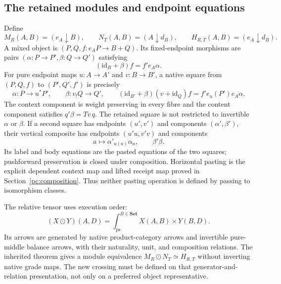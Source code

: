\documentclass[11pt,a4paper]{article}
\theoremstyle{definition}
\newcommand{\Set}{\mathbf{Set}}
\newcommand{\id}{\mathrm{id}}
\newcommand{\psint}{\int_{\mathrm{ps}}}
\begin{document}
\subsection{The retained modules and endpoint equations}

Define
\[
 M_R(A,B)=(e_A\downarrow B),\qquad
 N_T(A,B)=(A\downarrow d_B),\qquad
 H_{R,T}(A,B)=(e_A\downarrow d_B).
\]
A mixed object is $(P,Q,f:e_AP\to B+Q)$. Its fixed-endpoint morphisms are
pairs $(\alpha:P\to P',\beta:Q\to Q')$ satisfying
\[
 (\id_B+\beta)f=f'e_A\alpha.
\]
For pure endpoint maps $u:A\to A'$ and $v:B\to B'$, a native square from
$(P,Q,f)$ to $(P',Q',f')$ is precisely
\begin{equation}\label{eq:endpoint-square}
 \alpha:P\longrightarrow u^*P',\qquad
 \beta:v_!Q\longrightarrow Q',\qquad
 (\id_{B'}+\beta)(v+\id_Q)f
 =f'e_u(P')e_A\alpha.
\end{equation}
The context component is weight preserving in every fibre and the content
component satisfies $q'\beta=Tv\,q$. The retained square is not restricted
to invertible $\alpha$ or $\beta$.
If a second square has endpoints $(u',v')$ and components
$(\alpha',\beta')$, their vertical composite has endpoints
$(u'u,v'v)$ and components
\[
 a\longmapsto\alpha'_{u(a)}\alpha_a,\qquad \beta'\beta.
\]
Its label and body equations are the pasted equations of the two squares;
pushforward preservation is closed under composition. Horizontal pasting
is the explicit dependent context map and lifted receipt map proved in
Section~\ref{pc:composition}. Thus neither pasting operation is defined by
passing to isomorphism classes.

The relative tensor uses execution order:
\[
 (X\odot Y)(A,D)=\psint^{B\in\Set}X(A,B)\times Y(B,D).
\]
Its arrows are generated by native product-category arrows and invertible
pure-middle balance arrows, with their naturality, unit, and composition
relations. The inherited theorem gives a module equivalence
$M_R\odot N_T\simeq H_{R,T}$ without inverting native grade maps.
The new crossing must be defined on that generator-and-relation
presentation, not only on a preferred object representative.
\end{document}
